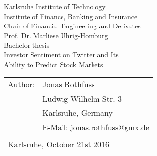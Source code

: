 \documentclass[a4paper,12pt]{article}%
\begin{document}
\begin{titlepage}
    \begin{center}
        {\Large Karlsruhe Institute of Technology\\[0.4cm]
            Institute of Finance, Banking and Insurance\\[0.3cm]
            Chair of Financial Engineering and Derivates\\[0.3cm]
            Prof. Dr. Marliese Uhrig-Homburg}\\[3.5cm]
        {\large Bachelor thesis}\\[1.5cm]
        {\Huge Investor Sentiment on Twitter and Its \\ \vspace{5mm} Ability to Predict Stock Markets }\\[8cm]
    \end{center}
    \renewcommand{\baselinestretch}{1.2}\small\normalsize
    \begin{tabular}{ll}
        Author:  & Jonas Rothfuss\\
        & Ludwig-Wilhelm-Str. 3\\
        & Karlsruhe, Germany\\
        & E-Mail: jonas.rothfuss@gmx.de\\\\
        \multicolumn{2}{l}{Karlsruhe, October 21st 2016}
    \end{tabular}
    \vfill
\end{titlepage}

\sloppy

\onehalfspacing

\pagebreak%
\doublespacing %

\setcounter{page}{1}
\tableofcontents
\newpage
\listoffigures
{}
\newpage
\listoftables
{}
\newpage
\end{document}
